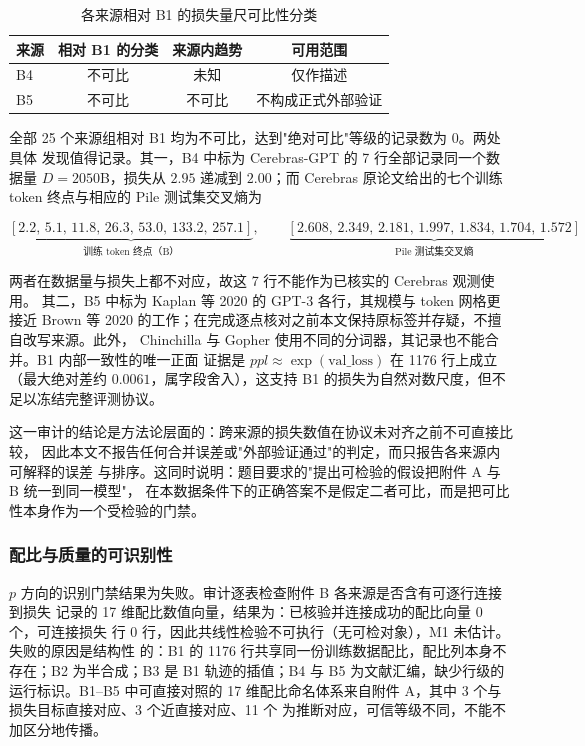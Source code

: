 \documentclass[bwprint]{gmcmthesis}
\numberwithin{equation}{section}
\numberwithin{figure}{section}
\numberwithin{table}{section}
\begin{document}
\begin{table}[htp!]
\centering
\renewcommand\arraystretch{1.2}
\caption{各来源相对 B1 的损失量尺可比性分类}\label{tab:q2-protocol}
\begin{tabular*}{\textwidth}{@{\extracolsep{\fill}}lccc@{}}
\toprule
来源 & 相对 B1 的分类 & 来源内趋势 & 可用范围 \\
\midrule
B4 & 不可比 & 未知 & 仅作描述 \\
B5 & 不可比 & 不可比 & 不构成正式外部验证 \\
\bottomrule
\end{tabular*}
\end{table}

全部 25 个来源组相对 B1 均为不可比，达到"绝对可比"等级的记录数为 0。两处具体
发现值得记录。其一，B4 中标为 Cerebras-GPT 的 7 行全部记录同一个数据量
$D=2050$B，损失从 $2.95$ 递减到 $2.00$；而 Cerebras 原论文给出的七个训练 token
终点与相应的 Pile 测试集交叉熵为

\begin{equation}
\underbrace{[2.2,\,5.1,\,11.8,\,26.3,\,53.0,\,133.2,\,257.1]}_{\text{训练 token 终点（B）}},
\qquad
\underbrace{[2.608,\,2.349,\,2.181,\,1.997,\,1.834,\,1.704,\,1.572]}_{\text{Pile 测试集交叉熵}}
\end{equation}

两者在数据量与损失上都不对应，故这 7 行不能作为已核实的 Cerebras 观测使用。
其二，B5 中标为 Kaplan 等 2020 的 GPT-3 各行，其规模与 token 网格更接近 Brown 等
2020 的工作；在完成逐点核对之前本文保持原标签并存疑，不擅自改写来源。此外，
Chinchilla 与 Gopher 使用不同的分词器，其记录也不能合并。B1 内部一致性的唯一正面
证据是 $ppl\approx\exp(\mathrm{val\_loss})$ 在 1176 行上成立（最大绝对差约
$0.0061$，属字段舍入），这支持 B1 的损失为自然对数尺度，但不足以冻结完整评测协议。

这一审计的结论是方法论层面的：跨来源的损失数值在协议未对齐之前不可直接比较，
因此本文不报告任何合并误差或"外部验证通过"的判定，而只报告各来源内可解释的误差
与排序。这同时说明：题目要求的"提出可检验的假设把附件 A 与 B 统一到同一模型"，
在本数据条件下的正确答案不是假定二者可比，而是把可比性本身作为一个受检验的门禁。

\subsubsection{配比与质量的可识别性}

$p$ 方向的识别门禁结果为失败。审计逐表检查附件 B 各来源是否含有可逐行连接到损失
记录的 17 维配比数值向量，结果为：已核验并连接成功的配比向量 0 个，可连接损失
行 0 行，因此共线性检验不可执行（无可检对象），M1 未估计。失败的原因是结构性
的：B1 的 1176 行共享同一份训练数据配比，配比列本身不存在；B2 为半合成；B3 是
B1 轨迹的插值；B4 与 B5 为文献汇编，缺少行级的运行标识。B1--B5 中可直接对照的
17 维配比命名体系来自附件 A，其中 3 个与损失目标直接对应、3 个近直接对应、11 个
为推断对应，可信等级不同，不能不加区分地传播。
\end{document}
